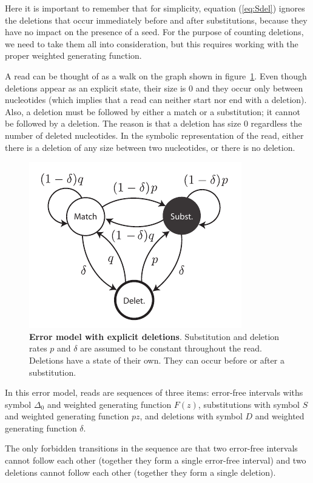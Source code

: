 \documentclass{article}
\begin{document}
Here it is important to remember that for simplicity, equation
(\ref{eq:Sdel}) ignores the deletions that occur immediately before and
after substitutions, because they have no impact on the presence of a
seed. For the purpose of counting deletions, we need to take them all into
consideration, but this requires working with the proper weighted
generating function.

A read can be thought of as a walk on the graph shown in
figure~\ref{fig:deletions2}. Even though deletions appear as an explicit
state, their size is $0$ and they occur only between nucleotides (which
implies that a read can neither start nor end with a deletion). Also, a
deletion must be followed by either a match or a substitution; it cannot
be followed by a deletion. The reason is that a deletion has size $0$
regardless the number of deleted nucleotides. In the symbolic
representation of the read, either there is a deletion of any size between
two nucleotides, or there is no deletion.

\begin{figure}[h]
\centering
\includegraphics[scale=0.9]{deletions2.pdf}
\caption{\textbf{Error model with explicit deletions}. 
Substitution and deletion rates $p$ and $\delta$ are assumed to be
constant throughout the read. Deletions have a state of their own.
They can occur before or after a substitution.}
\label{fig:deletions2}
\end{figure}

In this error model, reads are sequences of three items:
error-free intervals withs symbol $\Delta_0$ and weighted generating
function $F(z)$, substitutions with symbol $S$ and weighted generating
function $pz$, and deletions with symbol $D$ and weighted generating
function $\delta$.

The only forbidden transitions in the sequence are that two error-free
intervals cannot follow each other (together they form a single error-free
interval) and two deletions cannot follow each other (together they form a
single deletion).
\end{document}
